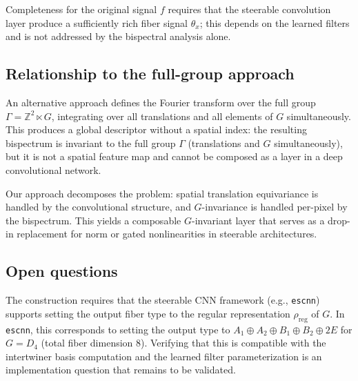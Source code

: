 \documentclass{article}
\theoremstyle{definition}
\theoremstyle{remark}
\newcommand{\Z}{\mathbb{Z}}
\begin{document}
Completeness for the original signal $f$ requires that the steerable convolution layer produce a sufficiently rich fiber signal $\theta_x$; this depends on the learned filters and is not addressed by the bispectral analysis alone.

\subsection{Relationship to the full-group approach}

An alternative approach defines the Fourier transform over the full group $\Gamma = \Z^2 \ltimes G$, integrating over all translations and all elements of $G$ simultaneously. This produces a global descriptor without a spatial index: the resulting bispectrum is invariant to the full group $\Gamma$ (translations and $G$ simultaneously), but it is not a spatial feature map and cannot be composed as a layer in a deep convolutional network.

Our approach decomposes the problem: spatial translation equivariance is handled by the convolutional structure, and $G$-invariance is handled per-pixel by the bispectrum. This yields a composable $G$-invariant layer that serves as a drop-in replacement for norm or gated nonlinearities in steerable architectures.

\subsection{Open questions}

The construction requires that the steerable CNN framework (e.g., \texttt{escnn}) supports setting the output fiber type to the regular representation $\rho_{\mathrm{reg}}$ of $G$. In \texttt{escnn}, this corresponds to setting the output type to $A_1 \oplus A_2 \oplus B_1 \oplus B_2 \oplus 2E$ for $G = D_4$ (total fiber dimension 8). Verifying that this is compatible with the intertwiner basis computation and the learned filter parameterization is an implementation question that remains to be validated.
\end{document}
